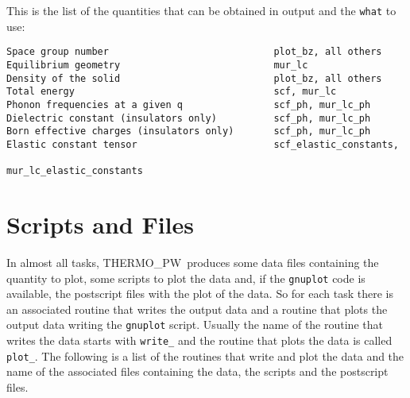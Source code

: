 \documentclass[12pt,a4paper]{article}
\def\tpw{{\sc THERMO\_PW}}
\begin{document}
This is the list of the quantities that can be obtained in output
and the \texttt{what} to use:

\begin{verbatim}
Space group number                             plot_bz, all others
Equilibrium geometry                           mur_lc
Density of the solid                           plot_bz, all others
Total energy                                   scf, mur_lc
Phonon frequencies at a given q                scf_ph, mur_lc_ph
Dielectric constant (insulators only)          scf_ph, mur_lc_ph
Born effective charges (insulators only)       scf_ph, mur_lc_ph
Elastic constant tensor                        scf_elastic_constants, 
                                               mur_lc_elastic_constants
\end{verbatim}

\newpage
\section{\color{coral}Scripts and Files}

In almost all tasks, \tpw\ produces some data files containing the quantity 
to plot, some scripts to plot the data and, if the \texttt{gnuplot} code
is available, the postscript files with the plot of the data. So for each 
task there is an associated routine
that writes the output data and a routine that plots the output data
writing the \texttt{gnuplot} script. Usually the name of the routine that
writes the data starts with \texttt{write\_} and the routine that plots
the data is called \texttt{plot\_}. The following is a list of the routines
that write and plot the data and the name of the associated files
containing the data, the scripts and the postscript files.
\end{document}
